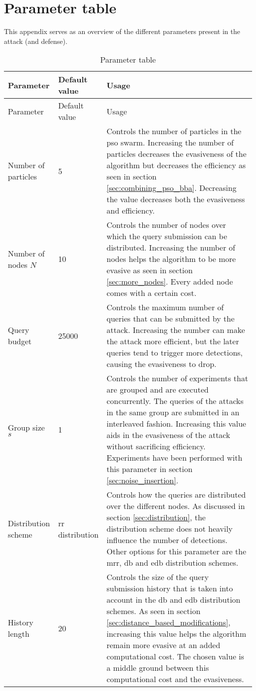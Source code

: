 \chapter{Parameter table}\label{app:parameter_tables}
This appendix serves as an overview of the different parameters present in the attack (and defense). 
\centering
\renewcommand*{\arraystretch}{1.7}
\begin{longtable}{p{3cm}p{2.5cm}p{7cm}}
\caption{Parameter table}
\label{tbl:parameter_table}\\
\toprule
Parameter &Default value &Usage \\ \midrule \endfirsthead
\toprule
Parameter &Default value &Usage \\ \midrule \endhead
\bottomrule\endfoot
Number of  particles	&5 &Controls the number of particles in the \gls{pso} swarm. Increasing the number of particles decreases the evasiveness of the algorithm but decreases the efficiency as seen in section \ref{sec:combining_pso_bba}. Decreasing the value decreases both the evasiveness and efficiency.\\
Number of nodes $N$&10 &Controls the number of nodes over which the query submission can be distributed. Increasing the number of nodes helps the algorithm to be more evasive as seen in section \ref{sec:more_nodes}. Every added node comes with a certain cost.\\
Query budget &25000 &Controls the maximum number of queries that can be submitted by the attack. Increasing the number can make the attack more efficient, but the later queries tend to trigger more detections, causing the evasiveness to drop.\\
Group size $s$ &1 &Controls the number of experiments that are grouped and are executed concurrently. The queries of the attacks in the same group are submitted in an interleaved fashion. Increasing this value aids in the evasiveness of the attack without sacrificing efficiency. Experiments have been performed with this parameter in section \ref{sec:noise_insertion}.\\
Distribution scheme &\gls{rr} distribution &Controls how the queries are distributed over the different nodes. As discussed in section \ref{sec:distribution}, the distribution scheme does not heavily influence the number of detections. Other options for this parameter are the \gls{mrr}, \gls{db} and \gls{edb} distribution schemes.\\
History length	&20	&Controls the size of the query submission history that is taken into account in the \gls{db} and \gls{edb} distribution schemes. As seen in section \ref{sec:distance_based_modifications}, increasing this value helps the algorithm remain more evasive at an added computational cost. The chosen value is a middle ground between this computational cost and the evasiveness.\\

\end{longtable}
